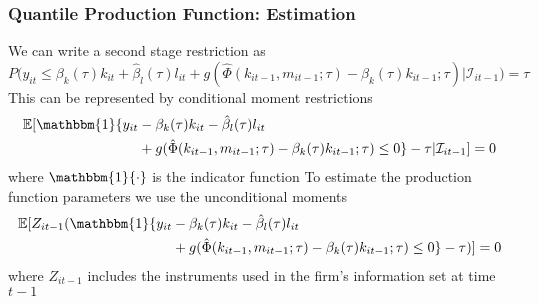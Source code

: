 \documentclass{beamer}
\begin{document}
\begin{frame}
\frametitle{Quantile Production Function: Estimation}
We can write a second stage restriction as
\begin{equation}
P\big(y_{it}\leq \beta_{k}(\tau)k_{it}+\hat{\beta}_{l}(\tau)l_{it}+g(\hat{\Phi}(k_{it-1}, m_{it-1}; \tau)-\beta_{k}(\tau)k_{it-1}; \tau)|\mathcal{I}_{it-1}\big)=\tau
\end{equation}
This can be represented by conditional moment restrictions
	\begin{equation}
	\begin{split}
	\mathbb{E}[\mathbbm{1}\{y_{it}&-\beta_{k}(\tau)k_{it}-\hat{\beta}_{l}(\tau)l_{it}\\
	&+g(\hat{\Phi}(k_{it-1}, m_{it-1}; \tau)-\beta_{k}(\tau)k_{it-1}; \tau)\leq 0\}-\tau|\mathcal{I}_{it-1}]=0
	\end{split}
	\end{equation}
	where $\mathbbm{1}\{\cdot\}$ is the indicator function
To estimate the production function parameters we use the unconditional moments
	\begin{equation}
	\begin{split}
	\mathbb{E}[Z_{it-1}(\mathbbm{1}\{y_{it}&-\beta_{k}(\tau)k_{it}-\hat{\beta}_{l}(\tau)l_{it}\\
	&+g(\hat{\Phi}(k_{it-1}, m_{it-1}; \tau)-\beta_{k}(\tau)k_{it-1}; \tau)\leq 0\}-\tau)]=0
	\end{split}
	\end{equation}
	where $Z_{it-1}$ includes the instruments used in the firm's information set at time $t-1$
	
\end{frame}
\end{document}
